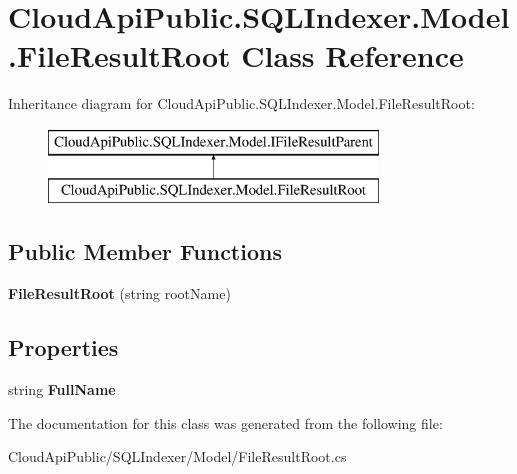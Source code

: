 \hypertarget{class_cloud_api_public_1_1_s_q_l_indexer_1_1_model_1_1_file_result_root}{\section{Cloud\-Api\-Public.\-S\-Q\-L\-Indexer.\-Model.\-File\-Result\-Root Class Reference}
\label{class_cloud_api_public_1_1_s_q_l_indexer_1_1_model_1_1_file_result_root}
}
Inheritance diagram for Cloud\-Api\-Public.\-S\-Q\-L\-Indexer.\-Model.\-File\-Result\-Root\-:\begin{figure}[H]
\begin{center}
\leavevmode
\includegraphics[height=2.000000cm]{class_cloud_api_public_1_1_s_q_l_indexer_1_1_model_1_1_file_result_root}
\end{center}
\end{figure}
\subsection*{Public Member Functions}
\begin{DoxyCompactItemize}
\item 
\hypertarget{class_cloud_api_public_1_1_s_q_l_indexer_1_1_model_1_1_file_result_root_ad70788cc226884c3f0f15cbeb92ead79}{{\bfseries File\-Result\-Root} (string root\-Name)}\label{class_cloud_api_public_1_1_s_q_l_indexer_1_1_model_1_1_file_result_root_ad70788cc226884c3f0f15cbeb92ead79}

\end{DoxyCompactItemize}
\subsection*{Properties}
\begin{DoxyCompactItemize}
\item 
\hypertarget{class_cloud_api_public_1_1_s_q_l_indexer_1_1_model_1_1_file_result_root_a5b2ce9f5318c0a7348022dadecc6100c}{string {\bfseries Full\-Name}}\label{class_cloud_api_public_1_1_s_q_l_indexer_1_1_model_1_1_file_result_root_a5b2ce9f5318c0a7348022dadecc6100c}

\end{DoxyCompactItemize}


The documentation for this class was generated from the following file\-:\begin{DoxyCompactItemize}
\item 
Cloud\-Api\-Public/\-S\-Q\-L\-Indexer/\-Model/File\-Result\-Root.\-cs\end{DoxyCompactItemize}
